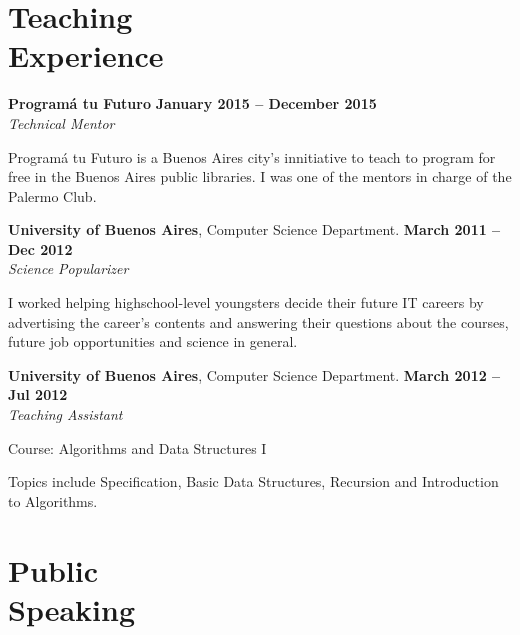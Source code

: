 \documentclass[margin,line]{resume}
\begin{document}
\begin{resume}
\section{\mysidestyle Teaching\\Experience}

\textbf{Program\'a tu Futuro} \hfill \textbf{January 2015 --  December 2015}
\\
\textsl{Technical Mentor} \hfill 
\begin{list2}
	\item Program\'a tu Futuro is a Buenos Aires city's innitiative to teach to program for free in the Buenos Aires public libraries. I was one of the mentors in charge of the Palermo Club.
\end{list2}\vspace{-1.5mm}

\textbf{University of Buenos Aires}, Computer Science Department. \hfill \textbf{March 2011 --  Dec 2012}
\\
\textsl{Science Popularizer} \hfill 
\begin{list2}
	\item I worked helping highschool-level youngsters decide their future IT careers by advertising the career's contents and answering their questions about the courses, future job opportunities and science in general. 
\end{list2}\vspace{-1.5mm}


\textbf{University of Buenos Aires}, Computer Science Department. \hfill \textbf{March 2012 --  Jul 2012}
\\
\textsl{Teaching Assistant} \hfill
\begin{list2}
	\item Course: Algorithms and Data Structures I
	\item Topics include Specification, Basic Data Structures, Recursion and Introduction to Algorithms.
\end{list2}\vspace{-1.5mm}

\vspace{2mm}
\section{\mysidestyle Public\\Speaking}


\end{resume}
\end{document}
